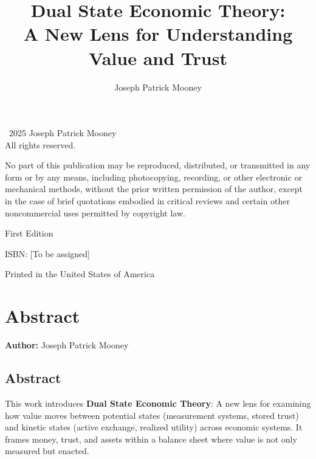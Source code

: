 \documentclass[11pt,oneside]{book}
\title{Dual State Economic Theory:\\A New Lens for Understanding Value and Trust}
\author{Joseph Patrick Mooney}
\date{}
\begin{document}
\maketitle
\thispagestyle{empty}

\newpage
\thispagestyle{empty}
\vspace*{\fill}
\begin{center}
\textcopyright\ 2025 Joseph Patrick Mooney\\
All rights reserved.\\

\vspace{1em}

No part of this publication may be reproduced, distributed, or transmitted in any form or by any means, including photocopying, recording, or other electronic or mechanical methods, without the prior written permission of the author, except in the case of brief quotations embodied in critical reviews and certain other noncommercial uses permitted by copyright law.

\vspace{2em}

First Edition

\vspace{2em}

ISBN: [To be assigned]

\vspace{2em}

Printed in the United States of America
\end{center}
\vspace*{\fill}

\newpage
\tableofcontents
\thispagestyle{plain}
\newpage

\chapter*{Abstract}


\textbf{Author:} Joseph Patrick Mooney

\section*{Abstract}

This work introduces \textbf{Dual State Economic Theory}: A new lens for examining how value moves between potential states (measurement systems, stored trust) and kinetic states (active exchange, realized utility) across economic systems. It frames money, trust, and assets within a balance sheet where value is not only measured but enacted. 
\end{document}
